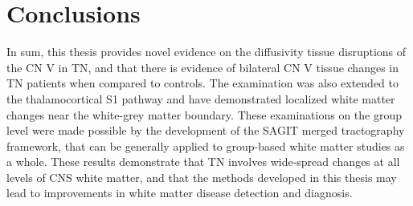 \section{Conclusions}

In sum, this thesis provides novel evidence on the diffusivity tissue disruptions of the CN V in TN, and that there is evidence of bilateral CN V tissue changes in TN patients when compared to controls. The examination was also extended to the thalamocortical S1 pathway and have demonstrated localized white matter changes near the white-grey matter boundary. These examinations on the group level were made possible by the development of the SAGIT merged tractography framework, that can be generally applied to group-based white matter studies as a whole. These results demonstrate that TN involves wide-spread changes at all levels of CNS white matter, and that the methods developed in this thesis may lead to improvements in white matter disease detection and diagnosis. 
